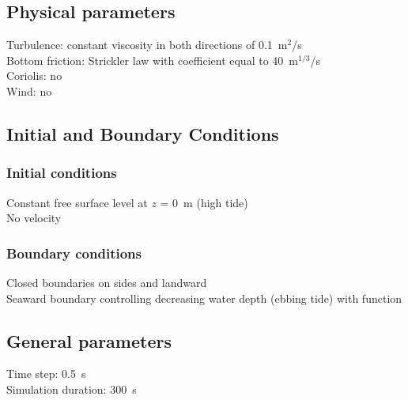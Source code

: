 \subsection{Physical parameters}
%
Turbulence: constant viscosity in both directions of 0.1~m$^2$/s\\
Bottom friction: Strickler law with coefficient equal to 40~m$^{1/3}$/s\\
Coriolis: no\\
Wind: no
%
%
%
%
%
%
\subsection{Initial and Boundary Conditions}
%
\subsubsection{Initial conditions}
%
Constant free surface level at $z$ = 0~m (high tide)\\
No velocity
%
\subsubsection{Boundary conditions}
%
Closed boundaries on sides and landward\\
Seaward boundary controlling decreasing water depth (ebbing tide) with
 function
%
\subsection{General parameters}
%
Time step: 0.5~s\\
Simulation duration: 300~s
%
%
%

